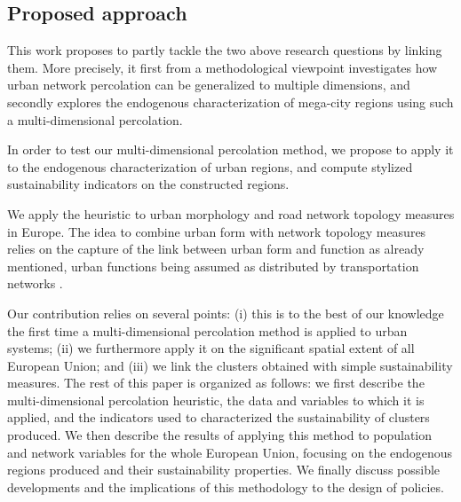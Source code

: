 \documentclass{jimis-en}
\begin{document}
\subsection{Proposed approach}


This work proposes to partly tackle the two above research questions by linking them. More precisely, it first from a methodological viewpoint investigates how urban network percolation can be generalized to multiple dimensions, and secondly explores the endogenous characterization of mega-city regions using such a multi-dimensional percolation.

In order to test our multi-dimensional percolation method, we propose to apply it to the endogenous characterization of urban regions, and compute stylized sustainability indicators on the constructed regions.


We apply the heuristic to urban morphology and road network topology measures in Europe. The idea to combine urban form with network topology measures relies on the capture of the link between urban form and function as already mentioned, urban functions being assumed as distributed by transportation networks \citep{raimbault2018caracterisation}.


Our contribution relies on several points: (i) this is to the best of our knowledge the first time a multi-dimensional percolation method is applied to urban systems; (ii) we furthermore apply it on the significant spatial extent of all European Union; and (iii) we link the clusters obtained with simple sustainability measures. The rest of this paper is organized as follows: we first describe the multi-dimensional percolation heuristic, the data and variables to which it is applied, and the indicators used to characterized the sustainability of clusters produced. We then describe the results of applying this method to population and network variables for the whole European Union, focusing on the endogenous regions produced and their sustainability properties. We finally discuss possible developments and the implications of this methodology to the design of policies.
\end{document}
